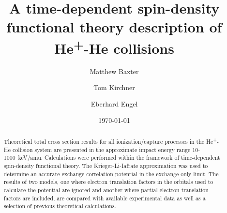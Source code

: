\documentclass[aps, pra, reprint, groupedaddress, amsfonts, longbibliography,
               amsmath, amssymb, showpacs, nofootinbib]{revtex4-1}
\begin{document}
\title{A time-dependent spin-density functional theory description of He\textsuperscript{+}-He
       collisions}
\author{Matthew Baxter}
\author{Tom Kirchner}
\author{Eberhard Engel}
\date{\today}

\begin{abstract}

   Theoretical total cross section results for all ionization/capture processes in the
   He\textsuperscript{+}-He collision system are presented in the approximate impact energy range
   10-1000~keV/amu. Calculations were performed within the framework of time-dependent spin-density
   functional theory. The Krieger-Li-Iafrate approximation was used to determine an accurate
   exchange-correlation potential in the exchange-only limit. The results of two models, one where
   electron translation factors in the orbitals used to calculate the potential are ignored and another
   where partial electron translation factors are included, are compared with available experimental
   data as well as a selection of previous theoretical calculations.

\end{abstract}

\maketitle
\end{document}
